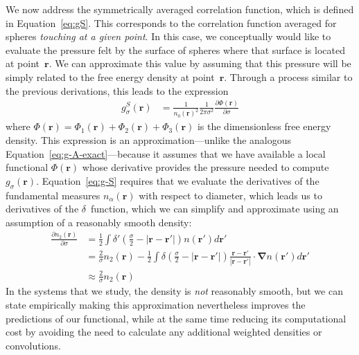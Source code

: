 \documentclass[letterpaper,amsmath,amssymb,10pt,pre]{revtex4-1}
\newcommand{\rr}{\textbf{r}}
\begin{document}
We now address the symmetrically averaged correlation function, which
is defined in Equation~\ref{eq:gS}.  This corresponds to the
correlation function averaged for spheres \emph{touching at a given
  point}.  In this case, we conceptually would like to evaluate the
pressure felt by the surface of spheres where that surface is located
at point~$\rr$.  We can approximate this value by assuming that this
pressure will be simply related to the free energy density at
point~$\rr$.  Through a process similar to the previous derivations, this
leads to the expression
\begin{align}
  g_\sigma^S(\rr)%
  &= \frac{1}{n_0(\rr)^2}\frac{1}{ 2\pi \sigma^2}
  \frac{\partial \Phi(\rr)}{\partial \sigma} \label{eq:g-S}
\end{align}
where $\Phi(\rr) = \Phi_1(\rr) + \Phi_2(\rr) + \Phi_3(\rr)$ is the
dimensionless free energy density.  This expression is an
approximation---unlike the analogous
Equation~\ref{eq:g-A-exact}---because it assumes that we have
available a local functional $\Phi(\rr)$ whose derivative provides the
pressure needed to compute $g_\sigma(\rr)$.  Equation~\ref{eq:g-S}
requires that we evaluate the derivatives of the fundamental measures
$n_\alpha(\rr)$ with respect to diameter, which leads us to
derivatives of the $\delta$~function, which we can simplify and
approximate using an assumption of a reasonably smooth density:
\begin{align}
  \frac{\partial n_2(\rr)}{\partial \sigma}
  &= \frac12 \int \delta'(\frac\sigma2 - |\rr-\rr'|) n(\rr')d\rr' \\
  &= \frac2{\sigma}n_2(\rr) - \frac12 \int \delta\left(\frac\sigma2 - |\rr-\rr'|\right)
  \frac{\rr-\rr'}{|\rr-\rr'|}\cdot\mathbf{\nabla}n(\rr')d\rr' \\
  &\approx \frac{2}{\sigma}n_2(\rr)
\end{align}
In the systems that we study, the density is \emph{not} reasonably
smooth, but we can state empirically making this approximation
nevertheless improves the predictions of our functional, while at the
same time reducing its computational cost by avoiding the need to
calculate any additional weighted densities or convolutions.
\end{document}
